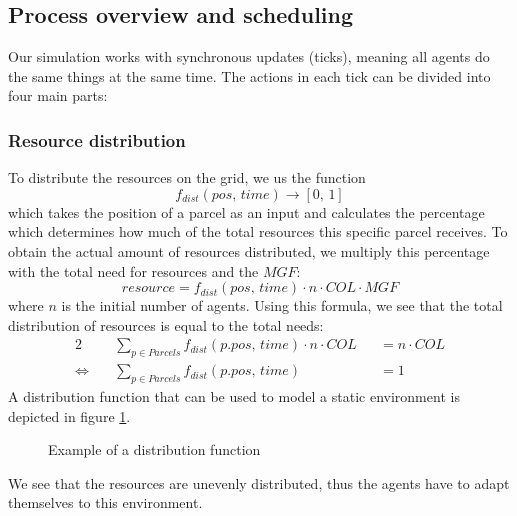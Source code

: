 \documentclass{JASSS}
\newcommand{\col}{\mathit{COL}}
\newcommand{\mgf}{\mathit{MGF}}
\begin{document}
\subsection{Process overview and scheduling}
Our simulation works with synchronous updates (ticks), meaning all agents do the same things at the same time. The actions in each tick can be divided into four main parts:

\subsubsection{Resource distribution}
	To distribute the resources on the grid, we us the function
	\begin{equation}
		f_\mathit{dist}(\mathit{pos},\, \mathit{time}) \to [0,\, 1]
	\end{equation}
	which takes the position of a parcel as an input and calculates the percentage which determines how much of the total resources this specific parcel receives. To obtain the actual amount of resources distributed, we multiply this percentage with the total need for resources and the $\mgf$:
	\begin{equation}
		resource = f_\mathit{dist}(\mathit{pos},\, \mathit{time}) \cdot n \cdot \col \cdot \mgf
	\end{equation}
	where $n$ is the initial number of agents. Using this formula, we see that the total distribution of resources is equal to the total needs:
	\begin{alignat}{2}
		&\sum_{p \in \mathit{Parcels}} f_\mathit{dist}(\mathit{p.pos},\, \mathit{time}) \cdot n \cdot \col &&= n \cdot \col\\
		\Longleftrightarrow \quad &\sum_{p \in \mathit{Parcels}} f_\mathit{dist}(\mathit{p.pos},\, \mathit{time}) &&= 1
	\end{alignat}
	A distribution function that can be used to model a static environment is depicted in figure \ref{fig:dist_funct}.
	\begin{figure}[h!]
		\begin{center}
			\caption{Example of a distribution function\label{fig:dist_funct}}
		\end{center}
	\end{figure}
	We see that the resources are unevenly distributed, thus the agents have to adapt themselves to this environment.
	
\end{document}
